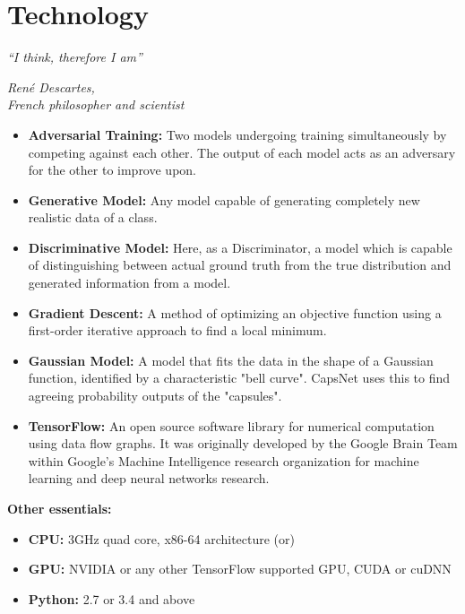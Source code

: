 \chapter{Technology}\label{ch:technology}
\epigraph{\textit{\Large “I think, therefore I am”}}{\textit{ \large René Descartes,\\ French philosopher and scientist}}
\begin{itemize}
	\item\textbf{Adversarial Training:} Two models undergoing training simultaneously by competing against each other. The output of each model acts as an adversary for the other to improve upon.
	\item\textbf{Generative Model:} Any model capable of generating completely new realistic data of a class.
	\item\textbf{Discriminative Model:} Here, as a Discriminator, a model which is capable of distinguishing between actual ground truth from the true distribution and generated information from a model.
	\item\textbf{Gradient Descent:} A method of optimizing an objective function using a first-order iterative approach to find a local minimum.
	\item\textbf{Gaussian Model:} A model that fits the data in the shape of a Gaussian function, identified by a characteristic "bell curve". CapsNet uses this to find agreeing probability outputs of the "capsules".
	\item\textbf{TensorFlow:} An open source software library for numerical computation using data flow graphs. It was originally developed by the Google Brain Team within Google's Machine Intelligence research organization for machine learning and deep neural networks research.

\end{itemize}

\textbf{\Large Other essentials:}

\begin{itemize}
	\item\textbf{CPU:} 3GHz quad core, x86-64 architecture (or)
	\item\textbf{GPU:} NVIDIA or any other TensorFlow supported GPU, CUDA or cuDNN
	\item\textbf{Python:} 2.7 or 3.4 and above
\end{itemize}
